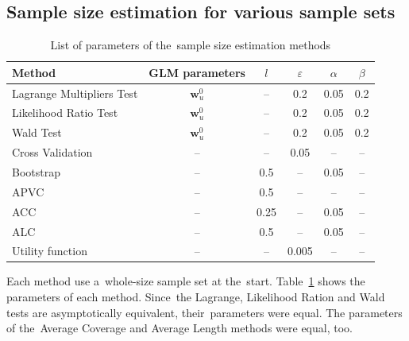 \documentclass[
11pt,%
tightenlines,%
twoside,%
onecolumn,%
nofloats,%
nobibnotes,%
nofootinbib,%
superscriptaddress,%
noshowpacs,%
centertags]%
{revtex4}
\begin{document}
\subsection{Sample size estimation for various sample sets}
\begin{table}[h!]
\begin{center}
\caption{List of parameters of the~sample size estimation methods}
\label{table3}
\begin{tabular}{l|c|c|c|c|c}
\hline 
Method& GLM parameters& $l$& $\varepsilon$	& $\alpha$& $\beta$\\ 
\hline	
Lagrange	Multipliers Test	& $\mathbf{w}_{u}^0$	& -- & 0.2& 0.05& 0.2\\
\hline	
Likelihood Ratio Test			& $\mathbf{w}_{u}^0$	& -- & 0.2& 0.05& 0.2\\
\hline	
Wald	Test							& $\mathbf{w}_{u}^0$	& -- & 0.2& 0.05& 0.2\\
\hline	
Cross Validation 				& -- & -- 	& 0.05& -- & --\\
\hline	
Bootstrap 							& -- & 0.5	& -- & 0.05& --\\
\hline	
APVC 									& -- & 0.5	& -- & -- & --\\
\hline	
ACC 									& -- & 0.25	& -- & 0.05& --\\
\hline	
ALC 										& -- & 0.5	& -- & 0.05& --\\
\hline	
Utility function 					& -- & -- 	& 0.005& -- & --\\
\hline
\end{tabular}
\end{center}
\end{table}


Each method use a~whole-size sample set at the~start. Table~\ref{table3} shows the parameters of each method. Since~the Lagrange, Likelihood Ration and Wald tests are asymptotically equivalent, their~parameters were equal. The parameters of the~Average Coverage and Average Length methods were equal, too.
\end{document}
